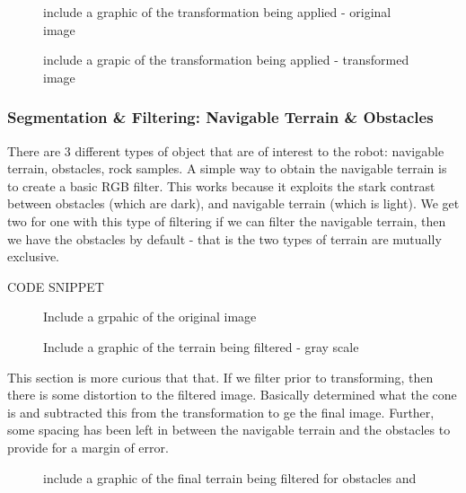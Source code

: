 \documentclass[a4paper]{article}
\begin{document}
\begin{figure}
\begin{minipage}{0.45\linewidth}
\centering
\caption{include a graphic of the transformation being applied - original image}
\end{minipage}
\begin{minipage}{0.45\linewidth}
\centering
\caption{include a grapic of the transformation being applied - transformed image}
\end{minipage}
\end{figure}

\subsubsection{Segmentation \& Filtering: Navigable Terrain \& Obstacles}
There are 3 different types of object that are of interest to the robot: navigable terrain, obstacles, rock samples. A simple way to obtain the navigable terrain is to create a basic RGB filter. This works because it exploits the stark contrast between obstacles (which are dark), and navigable terrain (which is light). We get two for one with this type of filtering if we can filter the navigable terrain, then we have the obstacles by default - that is the two types of terrain are mutually exclusive.

CODE SNIPPET

\begin{figure}
\begin{minipage}{0.45\linewidth}
\centering
\caption{Include a grpahic of the original image}
\end{minipage}
\begin{minipage}{0.45\linewidth}
\centering
\caption{Include a graphic of the terrain being filtered - gray scale}
\end{minipage}
\end{figure}

This section is more curious that that. If we filter prior to transforming, then there is some distortion to the filtered image. Basically determined what the cone is and subtracted this from the transformation to ge the final image. Further, some spacing has been left in between the navigable terrain and the obstacles to provide for a margin of error.

\begin{figure}
\centering
\caption{include a graphic of the final terrain being filtered for obstacles and }
\end{figure}
\end{document}
